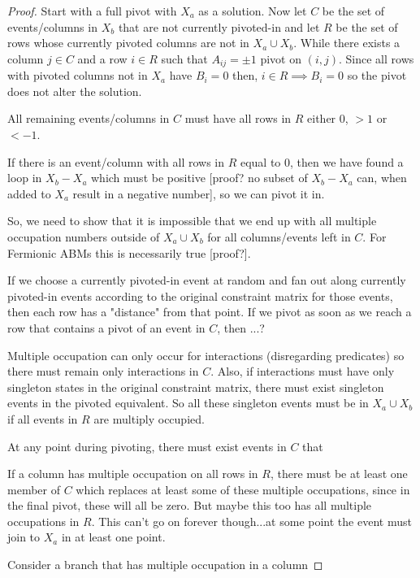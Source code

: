 \documentclass{article}
\begin{document}
\begin{proof}
Start with a full pivot with $X_a$ as a solution. Now let $C$ be the set of events/columns in $X_b$ that are not currently pivoted-in and let $R$ be the set of rows whose currently pivoted columns are not in $X_a \cup X_b$. While there exists a column $j \in C$ and a row $i \in R$ such that $A_{ij} = \pm 1$ pivot on $(i,j)$. Since all rows with pivoted columns not in $X_a$ have $B_i = 0$ then, $i \in R \implies B_i = 0$ so the pivot does not alter the solution.

All remaining events/columns in $C$ must have all rows in $R$ either $0$, $>1$ or $<-1$.

If there is an event/column with all rows in $R$ equal to $0$, then we have found a loop in $X_b-X_a$ which must be positive [proof? no subset of $X_b - X_a$ can, when added to $X_a$ result in a negative number], so we can pivot it in.

So, we need to show that it is impossible that we end up with all multiple occupation numbers outside of $X_a \cup X_b$ for all columns/events left in $C$. For Fermionic ABMs this is necessarily true [proof?].

If we choose a currently pivoted-in event at random and fan out along currently pivoted-in events according to the original constraint matrix for those events, then each row has a "distance" from that point. If we pivot as soon as we reach a row that contains a pivot of an event in $C$, then ...? 

Multiple occupation can only occur for interactions (disregarding predicates) so there must remain only interactions in $C$. Also, if interactions must have only singleton states in the original constraint matrix, there must exist singleton events in the pivoted equivalent. So all these singleton events must be in $X_a \cup X_b$ if all events in $R$ are multiply occupied.

At any point during pivoting, there must exist events in $C$ that 

If a column has multiple occupation on all rows in $R$, there must be at least one member of $C$ which replaces at least some of these multiple occupations, since in the final pivot, these will all be zero. But maybe this too has all multiple occupations in $R$. This can't go on forever though...at some point the event must join to $X_a$ in at least one point.

Consider a branch that has multiple occupation in a column

\end{proof}
\end{document}
